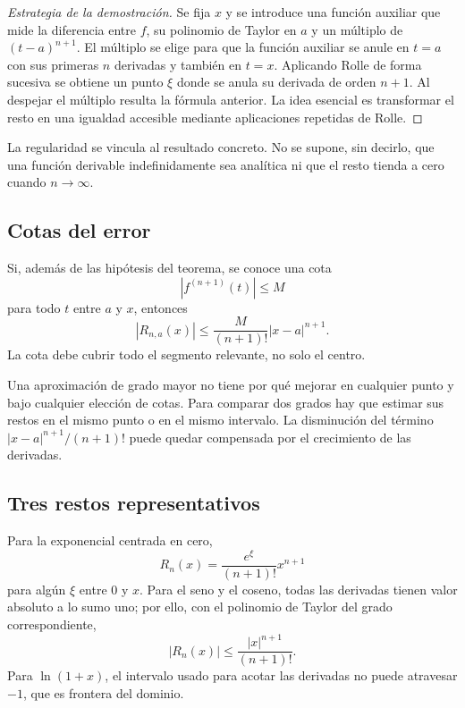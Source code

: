 \begin{proof}[Estrategia de la demostración]
Se fija \(x\) y se introduce una función auxiliar que mide la diferencia
entre \(f\), su polinomio de Taylor en \(a\) y un múltiplo de
\((t-a)^{n+1}\). El múltiplo se elige para que la función auxiliar se anule
en \(t=a\) con sus primeras \(n\) derivadas y también en \(t=x\). Aplicando
Rolle de forma sucesiva se obtiene un punto \(\xi\) donde se anula su
derivada de orden \(n+1\). Al despejar el múltiplo resulta la fórmula
anterior. La idea esencial es transformar el resto en una igualdad accesible
mediante aplicaciones repetidas de Rolle.
\end{proof}

La regularidad se vincula al resultado concreto. No se supone, sin decirlo,
que una función derivable indefinidamente sea analítica ni que el resto tienda
a cero cuando \(n\to\infty\).

\subsection{Cotas del error}

Si, además de las hipótesis del teorema, se conoce una cota
\[
  |f^{(n+1)}(t)|\le M
\]
para todo \(t\) entre \(a\) y \(x\), entonces
\[
  |R_{n,a}(x)|
  \le \frac{M}{(n+1)!}|x-a|^{n+1}.
\]
La cota debe cubrir todo el segmento relevante, no solo el centro.

Una aproximación de grado mayor no tiene por qué mejorar en cualquier punto
y bajo cualquier elección de cotas. Para comparar dos grados hay que estimar
sus restos en el mismo punto o en el mismo intervalo. La disminución del
término \(|x-a|^{n+1}/(n+1)!\) puede quedar compensada por el crecimiento de
las derivadas.

\subsection{Tres restos representativos}

Para la exponencial centrada en cero,
\[
  R_n(x)=\frac{e^\xi}{(n+1)!}x^{n+1}
\]
para algún \(\xi\) entre \(0\) y \(x\). Para el seno y el coseno, todas las
derivadas tienen valor absoluto a lo sumo uno; por ello, con el polinomio de
Taylor del grado correspondiente,
\[
  |R_n(x)|\le\frac{|x|^{n+1}}{(n+1)!}.
\]
Para \(\ln(1+x)\), el intervalo usado para acotar las derivadas no puede
atravesar \(-1\), que es frontera del dominio.

